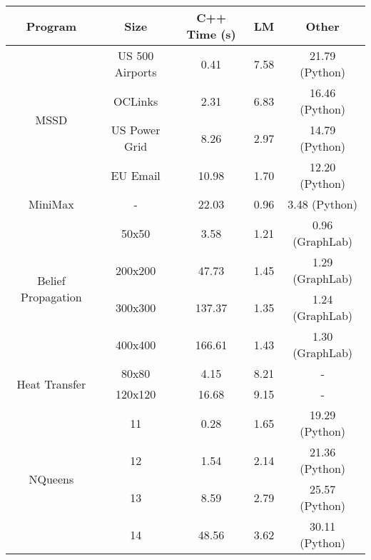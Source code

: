 \begin{tabular}{c | c || c | c | c} \hline
	\textbf{Program} & \textbf{Size} & \textbf{C++ Time} (s) & \textbf{LM} & \textbf{Other} \\ \hline \hline
	\multirow{4}{*}{MSSD}  & US 500 Airports &  0.41  &  7.58  &  21.79 (Python) \\
		 & OCLinks &  2.31  &  6.83  &  16.46 (Python) \\
		 & US Power Grid &  8.26  &  2.97  &  14.79 (Python) \\
		 & EU Email &  10.98  &  1.70  &  12.20 (Python) \\
	\hline
	MiniMax  & - &  22.03  &  0.96  &  3.48 (Python) \\
	\hline
	\multirow{4}{*}{Belief Propagation}  & 50x50 &  3.58  &  1.21  &  0.96 (GraphLab) \\
		 & 200x200 &  47.73  &  1.45  &  1.29 (GraphLab) \\
		 & 300x300 &  137.37  &  1.35  &  1.24 (GraphLab) \\
		 & 400x400 &  166.61  &  1.43  &  1.30 (GraphLab) \\
	\hline
	\multirow{2}{*}{Heat Transfer}  & 80x80 &  4.15  &  8.21  &  - \\
		 & 120x120 &  16.68  &  9.15  &  - \\
	\hline
	\multirow{4}{*}{NQueens}  & 11 &  0.28  &  1.65  &  19.29 (Python) \\
		 & 12 &  1.54  &  2.14  &  21.36 (Python) \\
		 & 13 &  8.59  &  2.79  &  25.57 (Python) \\
		 & 14 &  48.56  &  3.62  &  30.11 (Python) \\
	\hline
\end{tabular}
